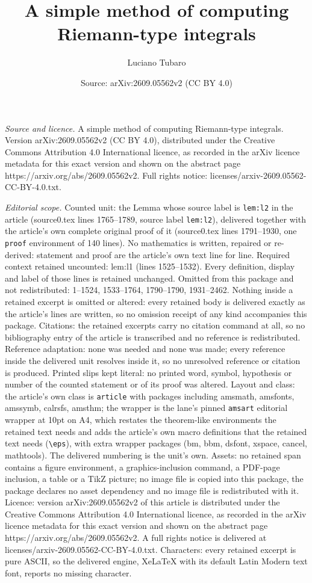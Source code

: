 \documentclass[10pt,a4paper]{amsart}
\title[A simple method of computing Riemann-type integrals]{A simple method of computing Riemann-type integrals}
\author{Luciano Tubaro}
\date{Source: arXiv:2609.05562v2 (CC BY 4.0)}
\begin{document}
\maketitle

\noindent\emph{Source and licence.} A simple method of computing Riemann-type integrals. Version arXiv:2609.05562v2 (CC BY 4.0), distributed under the Creative Commons Attribution 4.0 International licence, as recorded in the arXiv licence metadata for this exact version and shown on the abstract page https://arxiv.org/abs/2609.05562v2. Full rights notice: licenses/arxiv-2609.05562-CC-BY-4.0.txt.\par\smallskip

\noindent\textit{Editorial scope.} Counted unit: the Lemma whose source label is \texttt{lem:l2} in the article (source0.tex lines 1765--1789, source label \texttt{lem:l2}), delivered together with the article's own complete original proof of it (source0.tex lines 1791--1930, one \texttt{proof} environment of 140 lines). No mathematics is written, repaired or re-derived: statement and proof are the article's own text line for line. Required context retained uncounted: lem:l1 (lines 1525--1532). Every definition, display and label of those lines is retained unchanged. Omitted from this package and not redistributed: 1--1524, 1533--1764, 1790--1790, 1931--2462. Nothing inside a retained excerpt is omitted or altered: every retained body is delivered exactly as the article's lines are written, so no omission receipt of any kind accompanies this package. Citations: the retained excerpts carry no citation command at all, so no bibliography entry of the article is transcribed and no reference is redistributed. Reference adaptation: none was needed and none was made; every reference inside the delivered unit resolves inside it, so no unresolved reference or citation is produced. Printed slips kept literal: no printed word, symbol, hypothesis or number of the counted statement or of its proof was altered. Layout and class: the article's own class is \texttt{article} with packages including amsmath, amsfonts, amssymb, calrsfs, amsthm; the wrapper is the lane's pinned \texttt{amsart} editorial wrapper at 10pt on A4, which restates the theorem-like environments the retained text needs and adds the article's own macro definitions that the retained text needs (\texttt{\textbackslash eps}), with extra wrapper packages (bm, bbm, dsfont, xspace, cancel, mathtools). The delivered numbering is the unit's own. Assets: no retained span contains a figure environment, a graphics-inclusion command, a PDF-page inclusion, a table or a TikZ picture; no image file is copied into this package, the package declares no asset dependency and no image file is redistributed with it. Licence: version arXiv:2609.05562v2 of this article is distributed under the Creative Commons Attribution 4.0 International licence, as recorded in the arXiv licence metadata for this exact version and shown on the abstract page https://arxiv.org/abs/2609.05562v2. A full rights notice is delivered at licenses/arxiv-2609.05562-CC-BY-4.0.txt. Characters: every retained excerpt is pure ASCII, so the delivered engine, XeLaTeX with its default Latin Modern text font, reports no missing character.
\end{document}

